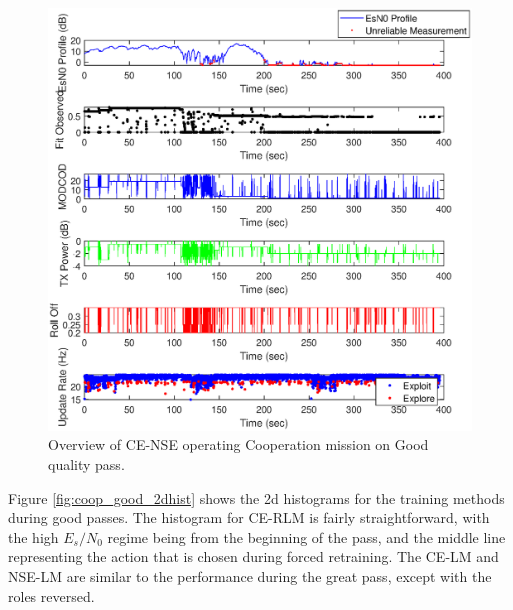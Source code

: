 \begin{figure}[ht]
\centering
\includegraphics[width=\textwidth]{figures/flight_results/coop_good_nse_overview.eps}
\caption{Overview of CE-NSE operating Cooperation mission on Good quality pass.}
\label{fig:flight_nse_coop_good_overview}
\end{figure}

\par Figure \ref{fig:coop_good_2dhist} shows the 2d histograms for the training methods during good passes. The histogram for CE-RLM is fairly straightforward, with the high $E_s/N_0$ regime being from the beginning of the pass, and the middle line representing the action that is chosen during forced retraining. The CE-LM and NSE-LM are similar to the performance during the great pass, except with the roles reversed. 

